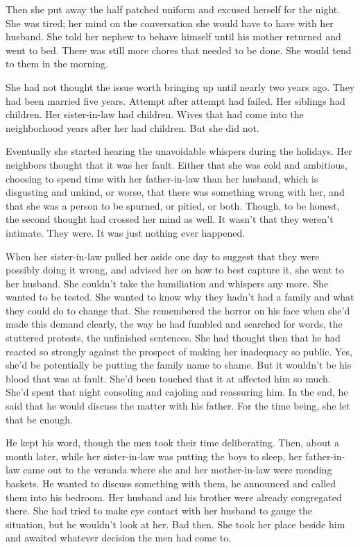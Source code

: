 \documentclass{article}
\begin{document}
Then she put away the half patched uniform and excused herself for the night.  She was tired; her mind on the conversation she would have to have with her husband. She told her nephew to behave himself until his mother returned and went to bed. There was still more chores that needed to be done. She would tend to them in the morning.

She had not thought the issue worth bringing up until nearly two years ago. They had been married five years. Attempt after attempt had failed. Her siblings had children. Her sister-in-law had children. Wives that had come into the neighborhood years after her had children. But she did not. 

Eventually she started hearing the unavoidable whispers during the holidays. Her neighbors thought that it was her fault. Either that she was cold and ambitious, choosing to spend time with her father-in-law than her husband, which is disgusting and unkind, or worse, that there was something wrong with her, and that she was a person to be spurned, or pitied, or both. Though, to be honest, the second thought had crossed her mind as well. It wasn't that they weren't intimate. They were. It was just nothing ever happened.

When her sister-in-law pulled her aside one day to suggest that they were possibly doing it wrong, and advised her on how to best capture it, she went to her husband. She couldn't take the humiliation and whispers any more. She wanted to be tested. She wanted to know why they hadn't had a family and what they could do to change that. She remembered the horror on his face when she'd made this demand clearly, the way he had fumbled and searched for words, the stuttered protests, the unfinished sentences. She had thought then that he had reacted so strongly against the prospect of making her inadequacy so public. Yes, she'd be potentially be putting the family name to shame. But it wouldn't be his blood that was at fault. She'd been touched that it at affected him so much. She'd spent that night consoling and cajoling and reassuring him. In the end, he said that he would discuss the matter with his father. For the time being, she let that be enough.

He kept his word, though the men took their time deliberating. Then, about a month later, while her sister-in-law was putting the boys to sleep, her father-in-law came out to the veranda where she and her mother-in-law were mending baskets. He wanted to discuss something with them, he announced and called them into his bedroom. Her husband and his brother were already congregated there. She had tried to make eye contact with her husband to gauge the situation, but he wouldn't look at her. Bad then. She took her place beside him and awaited whatever decision the men had come to. 
\end{document}
